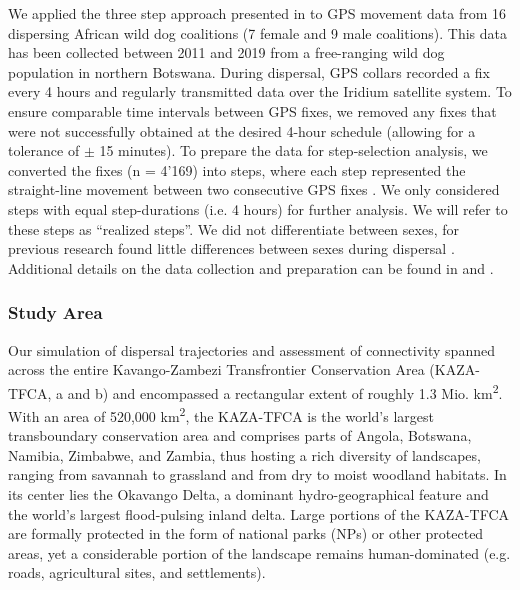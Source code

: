 \documentclass[../FinalThesis.tex]{subfiles}
\begin{document}
We applied the three step approach presented in  to GPS
movement data from 16 dispersing African wild dog coalitions (7 female and 9
male coalitions). This data has been collected between 2011 and 2019 from a
free-ranging wild dog population in northern Botswana. During dispersal, GPS
collars recorded a fix every 4 hours and regularly transmitted data over the
Iridium satellite system. To ensure comparable time intervals between GPS fixes,
we removed any fixes that were not successfully obtained at the desired 4-hour
schedule (allowing for a tolerance of \( \pm \) 15 minutes). To prepare the data
for step-selection analysis, we converted the fixes (n = 4'169) into steps,
where each step represented the straight-line movement between two consecutive
GPS fixes \citep{Turchin.1998}. We only considered steps with equal
step-durations (i.e. 4 hours) for further analysis. We will refer to these steps
as ``realized steps''. We did not differentiate between sexes, for previous
research found little differences between sexes during dispersal
\citep{Woodroffe.2020, Cozzi.2020}. Additional details on the data collection
and preparation can be found in \citet{Cozzi.2020} and \citet{Hofmann.2021}.


\subsubsection{Study Area}

Our simulation of dispersal trajectories and assessment of connectivity spanned
across the entire Kavango-Zambezi Transfrontier Conservation Area (KAZA-TFCA,
a and b) and encompassed a rectangular extent of roughly 1.3
Mio. km\textsuperscript{2}. With an area of 520,000 km\textsuperscript{2}, the
KAZA-TFCA is the world's largest transboundary conservation area and comprises
parts of Angola, Botswana, Namibia, Zimbabwe, and Zambia, thus hosting a rich
diversity of landscapes, ranging from savannah to grassland and from dry to
moist woodland habitats. In its center lies the Okavango Delta, a dominant
hydro-geographical feature and the world's largest flood-pulsing inland delta.
Large portions of the KAZA-TFCA are formally protected in the form of national
parks (NPs) or other protected areas, yet a considerable portion of the
landscape remains human-dominated (e.g. roads, agricultural sites, and
settlements).
\end{document}

